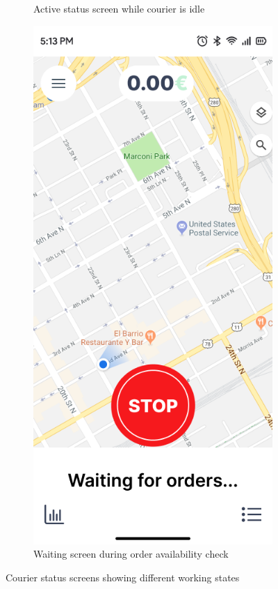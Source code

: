 \begin{figure}[h]
\begin{subfigure}[b]{0.48\textwidth}
        \caption{Active status screen while courier is idle}
        \label{fig:go_screen}
    \end{subfigure}
    \hfill
    \begin{subfigure}[b]{0.48\textwidth}
        \centering
        \includegraphics[width=\textwidth]{images/waiting_screen.png}
        \caption{Waiting screen during order availability check}
        \label{fig:waiting_screen}
    \end{subfigure}
    \caption{Courier status screens showing different working states}
    \label{fig:courier_status}
\end{figure}

